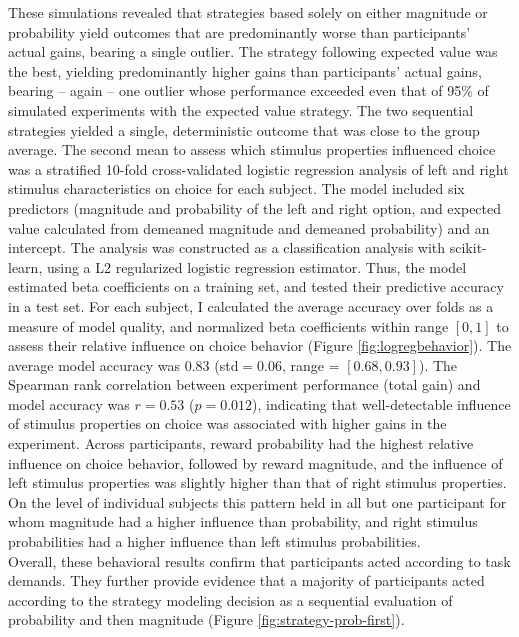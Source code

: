 These simulations revealed that strategies based solely on either magnitude or probability yield outcomes that are predominantly worse than participants' actual gains, bearing a single outlier.
The strategy following expected value was the best, yielding predominantly higher gains than participants' actual gains, bearing -- again -- one outlier whose performance exceeded even that of 95\% of simulated experiments with the expected value strategy.
The two sequential strategies yielded a single, deterministic outcome that was close to the group average.
The second mean to assess which stimulus properties influenced choice was a stratified 10-fold cross-validated logistic regression analysis of left and right stimulus characteristics on choice for each subject.
The model included six predictors (magnitude and probability of the left and right option, and expected value calculated from demeaned magnitude and demeaned probability) and an intercept.
The analysis was constructed as a classification analysis with scikit-learn, using a L2 regularized logistic regression estimator.
Thus, the model estimated beta coefficients on a training set, and tested their predictive accuracy in a test set.
For each subject, I calculated the average accuracy over folds as a measure of model quality, and normalized beta coefficients within range $[0, 1]$ to assess their relative influence on choice behavior (Figure \ref{fig:logregbehavior}).
The average model accuracy was $0.83$ (std$=0.06$, range = $[0.68, 0.93]$).
The Spearman rank correlation between experiment performance (total gain) and model accuracy was $r=0.53$ ($p=0.012$), indicating that well-detectable influence of stimulus properties on choice was associated with higher gains in the experiment.
Across participants, reward probability had the highest relative influence on choice behavior, followed by reward magnitude, and the influence of left stimulus properties was slightly higher than that of right stimulus properties.
On the level of individual subjects this pattern held in all but one participant for whom magnitude had a higher influence than probability, and right stimulus probabilities had a higher influence than left stimulus probabilities.\\
Overall, these behavioral results confirm that participants acted according to task demands.
They further provide evidence that a majority of participants acted according to the strategy modeling decision as a sequential evaluation of probability and then magnitude (Figure \ref{fig:strategy-prob-first}).



